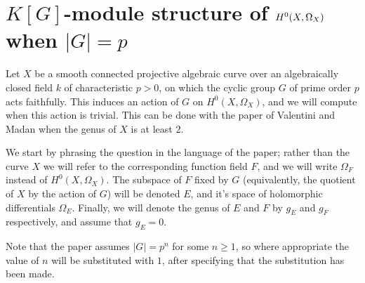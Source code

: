 \section{$K[G]$-module structure of ${H^0(X,\Omega_X)}$ when $|G|=p$}
Let $X$ be a smooth connected projective algebraic curve over an algebraically closed field $k$ of characteristic $p>0$, on which the cyclic group $G$ of prime order $p$ acts faithfully.
This induces an action of $G$ on $H^0(X,\Omega_X)$, and we will compute when this action is trivial.
This can be done with the paper of Valentini and Madan \cite{valmadan} when the genus of $X$ is at least $2$.

We start by phrasing the question in the language of the paper; rather than the curve $X$ we will refer to the corresponding function field $F$, and we will write $\Omega_F$ instead of $H^0(X,\Omega_X)$.
The subspace of $F$ fixed by $G$ (equivalently, the quotient of $X$ by the action of $G$) will be denoted $E$, and it's space of holomorphic differentials $\Omega_E$.
Finally, we will denote the genus of $E$ and $F$ by $g_E$ and $g_F$ respectively, and assume that $g_E=0$.

Note that the paper assumes $|G|=p^n$ for some $n \geq 1$, so where appropriate the value of $n$ will be substituted with $1$, after specifying that the substitution has been made.
 
